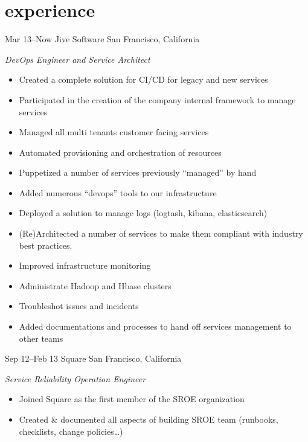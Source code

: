 \documentclass[]{friggeri-cv} %
\begin{document}

\section{experience}

\begin{entrylist}
\entry
{Mar 13--Now}
{Jive Software}
{San Francisco, California}
{\emph{DevOps Engineer and Service Architect} \\
\begin{itemize}
\item Created a complete solution for CI/CD for legacy and new services
\item Participated in the creation of the company internal framework to manage services
\item Managed all multi tenants customer facing services
\item Automated provisioning and orchestration of resources
\item Puppetized a number of services previously “managed” by hand
\item Added numerous “devops” tools to our infrastructure
\item Deployed a solution to manage logs (logtash, kibana, elasticsearch)
\item (Re)Architected a number of services to make them compliant with industry best practices.
\item Improved infrastructure monitoring
\item Administrate Hadoop and Hbase clusters
\item Troubleshot issues and incidents
\item Added documentations and processes to hand off services management to other teams
\end{itemize}}
\entry
{Sep 12--Feb 13}
{Square}
{San Francisco, California}
{\emph{Service Reliability Operation Engineer} \\
\begin{itemize}
\item Joined Square as the first member of the SROE organization
\item Created \& documented all aspects of building SROE team (runbooks, checklists, change policies…)

\end{itemize}}
\end{entrylist}
\end{document}
